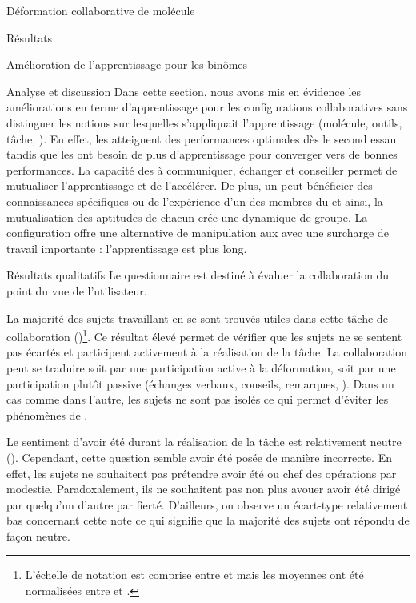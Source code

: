 \documentclass[myfrancais,ngerman,english,french]{mythesis}
\begin{document}
\begin{mychapter}{Déformation collaborative de molécule}
\begin{mysection}{Résultats}
\begin{mysubsection}{Amélioration de l'apprentissage pour les binômes}
\begin{mysubsubsection}{Analyse et discussion}
					Dans cette section, nous avons mis en évidence les améliorations en terme d'apprentissage pour les configurations collaboratives sans distinguer les notions sur lesquelles s'appliquait l'apprentissage (molécule, outils, tâche, \myetc).
					En effet, les  atteignent des performances optimales dès le second essau tandis que les  ont besoin de plus d'apprentissage pour converger vers de bonnes performances.
					La capacité des  à communiquer, échanger et conseiller permet de mutualiser l'apprentissage et de l'accélérer.
					De plus, un  peut bénéficier des connaissances spécifiques ou de l'expérience d'un des membres du  et ainsi, la mutualisation des aptitudes de chacun crée une dynamique de groupe.
					La configuration  offre une alternative de manipulation aux  avec une surcharge de travail importante : l'apprentissage est plus long.
				\end{mysubsubsection}
			\end{mysubsection}
			\begin{mysubsection}{Résultats qualitatifs}
				Le questionnaire est destiné à évaluer la collaboration du point du vue de l'utilisateur.

				La majorité des sujets travaillant en  se sont trouvés utiles dans cette tâche de collaboration ()\footnote{L'échelle de notation est comprise entre  et  mais les moyennes ont été normalisées entre  et .}.
				Ce résultat élevé permet de vérifier que les sujets ne se sentent pas écartés et participent activement à la réalisation de la tâche.
				La collaboration peut se traduire soit par une participation active à la déformation, soit par une participation plutôt passive (échanges verbaux, conseils, remarques, \myetc).
				Dans un cas comme dans l'autre, les sujets ne sont pas isolés ce qui permet d'éviter les phénomènes de .

				Le sentiment d'avoir été  durant la réalisation de la tâche est relativement neutre ().
				Cependant, cette question semble avoir été posée de manière incorrecte.
				En effet, les sujets ne souhaitent pas prétendre avoir été  ou chef des opérations par modestie.
				Paradoxalement, ils ne souhaitent pas non plus avouer avoir été dirigé par quelqu'un d'autre par fierté.
				D'ailleurs, on observe un écart-type relativement bas concernant cette note ce qui signifie que la majorité des sujets ont répondu de façon neutre.


\end{mysubsection}
\end{mysection}
\end{mychapter}
\end{document}
